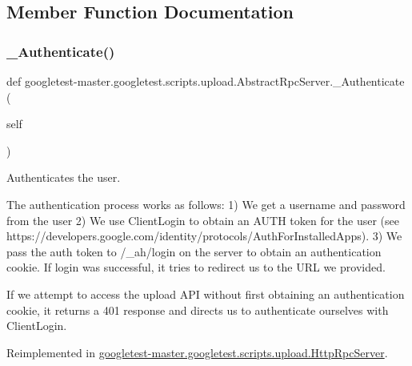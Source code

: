 \subsection{Member Function Documentation}
\mbox{\label{classgoogletest-master_1_1googletest_1_1scripts_1_1upload_1_1_abstract_rpc_server_ae2d84f4ca4955d9bf1460531748fa432}} 
\subsubsection{\texorpdfstring{\_Authenticate()}{\_Authenticate()}}
{\footnotesize\ttfamily def googletest-\/master.\+googletest.\+scripts.\+upload.\+Abstract\+Rpc\+Server.\+\_\+\+Authenticate (\begin{DoxyParamCaption}\item[{}]{self }\end{DoxyParamCaption})\hspace{0.3cm}{\ttfamily [private]}}

\begin{DoxyVerb}Authenticates the user.

The authentication process works as follows:
 1) We get a username and password from the user
 2) We use ClientLogin to obtain an AUTH token for the user
(see https://developers.google.com/identity/protocols/AuthForInstalledApps).
 3) We pass the auth token to /_ah/login on the server to obtain an
authentication cookie. If login was successful, it tries to redirect
us to the URL we provided.

If we attempt to access the upload API without first obtaining an
authentication cookie, it returns a 401 response and directs us to
authenticate ourselves with ClientLogin.
\end{DoxyVerb}
 

Reimplemented in \mbox{\hyperlink{classgoogletest-master_1_1googletest_1_1scripts_1_1upload_1_1_http_rpc_server_a9b7c7d5f1d0af70343bc097c989e0e39}{googletest-\/master.\+googletest.\+scripts.\+upload.\+Http\+Rpc\+Server}}.

\mbox{\label{classgoogletest-master_1_1googletest_1_1scripts_1_1upload_1_1_abstract_rpc_server_abeb1b996f2b47fddf1136aa5fa8cbc94}} 
